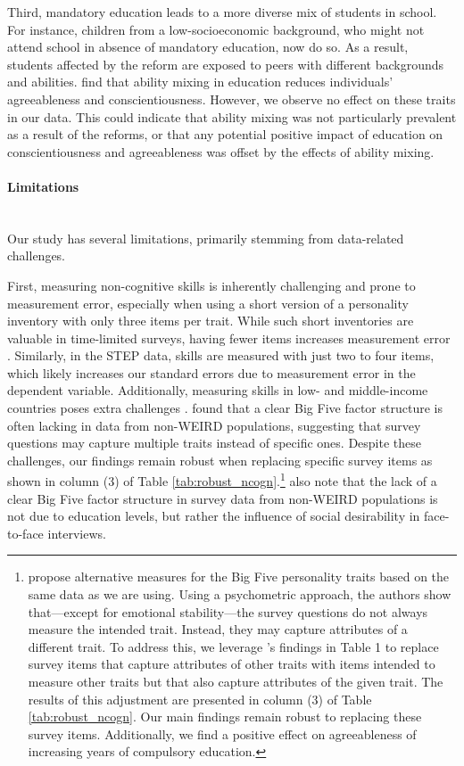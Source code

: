 Third, mandatory education leads to a more diverse mix of students in school. For instance, children from a low-socioeconomic background, who might not attend school in absence of mandatory education, now do so. As a result, students affected by the reform are exposed to peers with different backgrounds and abilities. \citet{ahn_long-term_2021} find that ability mixing in education reduces individuals' agreeableness and conscientiousness. However, we observe no effect on these traits in our data. This could indicate that ability mixing was not particularly prevalent as a result of the reforms, or that any potential positive impact of education on conscientiousness and agreeableness was offset by the effects of ability mixing.


\paragraph{Limitations} \label{sec:limitations} \mbox{}\\
Our study has several limitations, primarily stemming from data-related challenges.

First, measuring non-cognitive skills is inherently challenging and prone to measurement error, especially when using a short version of a personality inventory with only three items per trait. While such short inventories are valuable in time-limited surveys, having fewer items increases measurement error \parencite{dohmen_accounting_2024}. Similarly, in the STEP data, skills are measured with just two to four items, which likely increases our standard errors due to measurement error in the dependent variable. Additionally, measuring skills in low- and middle-income countries poses extra challenges \parencite{bauer_using_2020, laajaj_challenges_2019}. \citet{laajaj_challenges_2019} found that a clear Big Five factor structure is often lacking in data from non-WEIRD populations, suggesting that survey questions may capture multiple traits instead of specific ones. Despite these challenges, our findings remain robust when replacing specific survey items as shown in column (3) of Table \ref{tab:robust_ncogn}.\footnote{
	\citet{laajaj_challenges_2019} propose alternative measures for the Big Five personality traits based on the same data as we are using. Using a psychometric approach, the authors show that---except for emotional stability---the survey questions do not always measure the intended trait. Instead, they may capture attributes of a different trait. To address this, we leverage \citeauthor{laajaj_challenges_2019}'s \parencite*{laajaj_challenges_2019} findings in Table 1 to replace survey items that capture attributes of other traits with items intended to measure other traits but that also capture attributes of the given trait. The results of this adjustment are presented in column (3) of Table \ref{tab:robust_ncogn}. Our main findings remain robust to replacing these survey items. Additionally, we find a positive effect on agreeableness of increasing years of compulsory education.
} \citet{laajaj_challenges_2019} also note that the lack of a clear Big Five factor structure in survey data from non-WEIRD populations is not due to education levels, but rather the influence of social desirability in face-to-face interviews.


